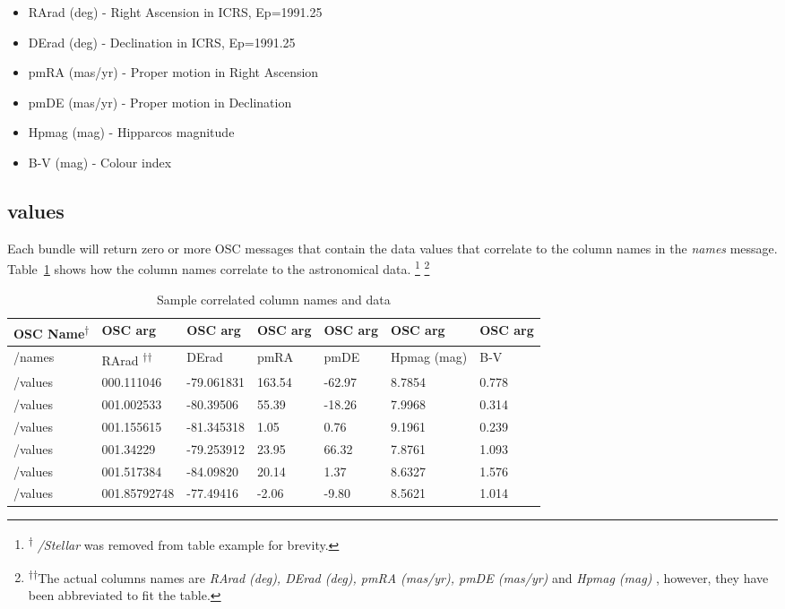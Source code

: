 \begin{itemize}
	\item RArad (deg) -  Right Ascension in ICRS, Ep=1991.25 
	\item DErad (deg) -  Declination in ICRS, Ep=1991.25
	\item pmRA (mas/yr) -  Proper motion in Right Ascension
	\item pmDE (mas/yr) - Proper motion in Declination 
	\item Hpmag (mag) - Hipparcos magnitude
	\item B-V (mag) -  Colour index
\end{itemize}

\subsection{values}
Each bundle will return zero or more OSC messages that contain the data values that correlate to the column names in the \textit{names} message. Table~\ref{tab:vizierData} shows how the column names correlate to the astronomical data. \footnote{\textsuperscript{$\dagger$} \textit{/Stellar} was removed from table example for brevity.} \footnote{\textsuperscript{$\dagger$$\dagger$}The actual columns names are \textit{RArad (deg),  DErad (deg), pmRA (mas/yr), pmDE (mas/yr)} and \textit{Hpmag (mag)} , however, they have been abbreviated to fit the table.}

\begin{table}
	\centering
	\caption{Sample correlated column names and data}
	\begin{tabular}{|l|l|l|l|l|l|l|}  \hline
		\textbf{OSC Name\textsuperscript{$\dagger$}}&\textbf{OSC arg}&\textbf{OSC arg}&\textbf{OSC arg}&\textbf{OSC arg}&\textbf{OSC arg}&\textbf{OSC arg} \\ \hline
		/names&RArad \textsuperscript{$\dagger$$\dagger$}&DErad &pmRA &pmDE &Hpmag (mag) &B-V\\ \hline
		/values&000.111046 &-79.061831 &163.54  & -62.97  &8.7854  &0.778\\ \hline
		/values&001.002533 &-80.39506  & 55.39  & -18.26  &7.9968  &0.314\\ \hline
		/values&001.155615 &-81.345318  &1.05     &0.76  &9.1961 & 0.239\\ \hline
		/values&001.34229  &-79.253912  & 23.95    &66.32  &7.8761  &1.093\\ \hline
		/values&001.517384 &-84.09820 &  20.14     &1.37  &8.6327  &1.576\\ \hline
		/values&001.85792748 &-77.49416  & -2.06    &-9.80  &8.5621  &1.014\\ \hline
		
		\hline\end{tabular}
	\label{tab:vizierData}
\end{table} 

